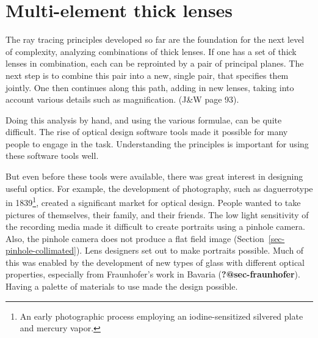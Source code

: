 \documentclass[
  letterpaper,
]{book}
\begin{document}
\section{Multi-element thick lenses}\label{multi-element-thick-lenses}

The ray tracing principles developed so far are the foundation for the
next level of complexity, analyzing combinations of thick lenses. If one
has a set of thick lenses in combination, each can be reprointed by a
pair of principal planes. The next step is to combine this pair into a
new, single pair, that specifies them jointly. One then continues along
this path, adding in new lenses, taking into account various details
such as magnification. (J\&W page 93).

Doing this analysis by hand, and using the various formulae, can be
quite difficult. The rise of optical design software tools made it
possible for many people to engage in the task. Understanding the
principles is important for using these software tools well.

But even before these tools were available, there was great interest in
designing useful optics. For example, the development of photography,
such as daguerrotype in 1839\footnote{An early photographic process
  employing an iodine-sensitized silvered plate and mercury vapor.},
created a significant market for optical design. People wanted to take
pictures of themselves, their family, and their friends. The low light
sensitivity of the recording media made it difficult to create portraits
using a pinhole camera. Also, the pinhole camera does not produce a flat
field image (Section~\ref{sec-pinhole-collimated}). Lens designers set
out to make portraits possible. Much of this was enabled by the
development of new types of glass with different optical properties,
especially from Fraunhofer's work in Bavaria
(\textbf{?@sec-fraunhofer}). Having a palette of materials to use made
the design possible.
\end{document}

